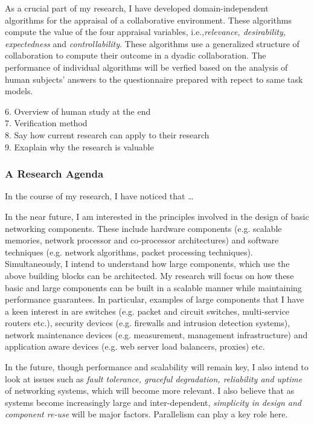 \documentclass[a4paper, 10pt]{article}
\begin{document}
\begin{small}
As a crucial part of my research, I have developed domain-independent algorithms
for the appraisal of a collaborative environment. These algorithms compute the
value of the four appraisal variables, i.e.,\textit{relevance, desirability,
expectedness} and \textit{controllability}. These algorithms use a generalized
structure of collaboration to compute their outcome in a dyadic collaboration.
The performance of individual algorithms will be verfied based on the analysis
of human subjects' answers to the questionnaire prepared with repect to same
task models.

6. Overview of human study at the end \\

7. Verification method \\

8. Say how current research can apply to their research \\

9. Exaplain why the research is valuable

\subsubsection*{A Research Agenda}

In the course of my research, I have noticed that \ldots

In the near future, I am interested in the 
principles involved in the design of basic networking 
components. These include
hardware components (e.g. scalable memories, 
network processor and co-processor architectures) and 
software techniques (e.g. network algorithms, packet processing 
techniques). 
  Simultaneously, I intend to understand how large components, which use
the above building blocks can be architected.
My research will focus on how these basic and large
components can be built in a scalable manner while maintaining 
performance guarantees. 
In particular, examples of large components that I have a keen
interest in are switches 
(e.g. packet and circuit switches, multi-service routers etc.), 
security devices (e.g. firewalls and intrusion detection 
systems), network maintenance devices (e.g. measurement,
management infrastructure) and application aware devices
(e.g. web server load balancers, proxies) etc. 

 In the future, though performance and scalability will remain key,
I also intend to look at issues such as {\it fault tolerance, graceful degradation,
reliability and uptime} of networking systems, which will become more relevant. 
I also believe that as systems become increasingly large and 
inter-dependent, {\it simplicity in design and component 
re-use} will be major factors.
Parallelism can play a key role here.


\end{small}
\end{document}

